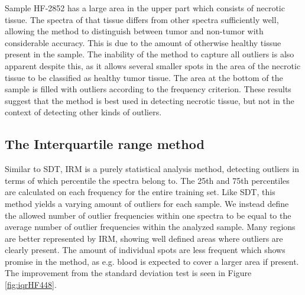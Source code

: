 Sample HF-2852 has a large area in the upper part which consists of necrotic tissue. The spectra of that tissue differs from other spectra sufficiently well, allowing the method to distinguish between tumor and non-tumor with considerable accuracy. This is due to the amount of otherwise healthy tissue present in the sample. The inability of the method to capture all outliers is also apparent despite this, as it allows several smaller spots in the area of the necrotic tissue to be classified as healthy tumor tissue. The area at the bottom of the sample is filled with outliers according to the frequency criterion. These results suggest that the method is best used in detecting necrotic tissue, but not in the context of detecting other kinds of outliers.

\subsection{The Interquartile range method}

Similar to SDT, IRM is a purely statistical analysis method, detecting outliers in terms of which percentile the spectra belong to. The 25th and 75th percentiles are calculated on each frequency for the entire training set. Like SDT, this method yields a varying amount of outliers for each sample. We instead define the allowed number of outlier frequencies within one spectra to be equal to the average number of outlier frequencies within the analyzed sample. Many regions are better represented by IRM, showing well defined areas where outliers are clearly present. The amount of individual spots are less frequent which shows promise in the method, as e.g. blood is expected to cover a larger area if present. The improvement from the standard deviation test is seen in Figure \ref{fig:iqrHF448}.


